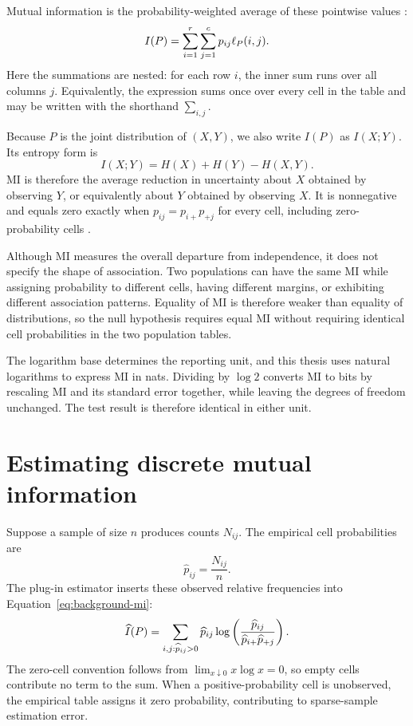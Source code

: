 Mutual information is the probability-weighted average of these pointwise
values \citep{shannon1948,bossomaier2016}:
\begin{equation}
  I(P)
  =\sum_{i=1}^{r}\sum_{j=1}^{c}p_{ij}\ell_P(i,j).
  \label{eq:background-mi}
\end{equation}
Here the summations are nested: for each row \(i\), the inner sum runs over
all columns \(j\). Equivalently, the expression sums once over every cell in
the table and may be written with the shorthand \(\sum_{i,j}\).

Because \(P\) is the joint distribution of \((X,Y)\), we also write
\(I(P)\) as \(I(X;Y)\). Its entropy form is
\begin{equation}
  I(X;Y)=H(X)+H(Y)-H(X,Y).
  \label{eq:mi-entropy-form}
\end{equation}
MI is therefore the average reduction in uncertainty about \(X\) obtained
by observing \(Y\), or equivalently about \(Y\) obtained by observing \(X\).
It is nonnegative and equals zero exactly when
\(p_{ij}=p_{i+}p_{+j}\) for every cell, including zero-probability cells
\citep{bossomaier2016}.

Although MI measures the overall departure from independence, it does not
specify the shape of association. Two populations can have the same MI while assigning
probability to different cells, having different margins, or exhibiting
different association patterns. Equality of MI is therefore weaker than equality of distributions, so
the null hypothesis requires equal MI without requiring identical cell
probabilities in the two population tables.

The logarithm base determines the reporting unit, and this thesis uses
natural logarithms to express MI in nats. Dividing by \(\log 2\)
converts MI to bits by rescaling MI and its standard error together,
while leaving the degrees of freedom unchanged. The test result is
therefore identical in either unit.

\section{Estimating discrete mutual information}
\label{sec:background-mi-bias}

Suppose a sample of size \(n\) produces counts \(N_{ij}\). The empirical cell
probabilities are
\begin{equation}
  \widehat p_{ij}=\frac{N_{ij}}{n}.
\end{equation}
The plug-in estimator inserts these observed relative frequencies into
Equation~\eqref{eq:background-mi}:
\begin{equation}
  \widehat I(P)
  =\sum_{i,j:\widehat p_{ij}>0}
  \widehat p_{ij}
  \log\left(
  \frac{\widehat p_{ij}}
       {\widehat p_{i+}\widehat p_{+j}}
  \right).
  \label{eq:plugin-mi-background}
\end{equation}
The zero-cell convention follows from
\(\lim_{x\downarrow0}x\log x=0\), so empty cells contribute no term to
the sum. When a positive-probability cell is unobserved, the empirical
table assigns it zero probability, contributing to sparse-sample estimation
error.


